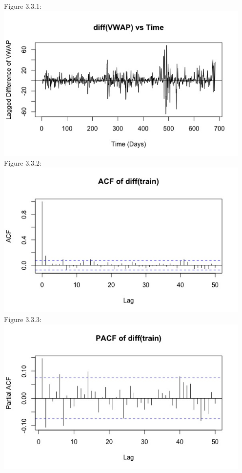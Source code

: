 \documentclass[12pt]{article}
\begin{document}
  Figure 3.3.1:\\
  \includegraphics[width=5in]{plots/ts_plot2.jpeg}\\
  Figure 3.3.2:\\
  \includegraphics[width=5in]{plots/ts_plot3.jpeg}\\
  Figure 3.3.3:\\
  \includegraphics[width=5in]{plots/ts_plot4.jpeg}\\
\end{document}

